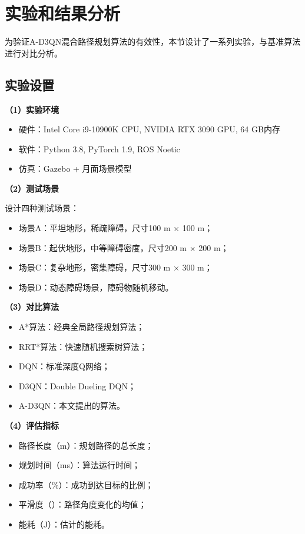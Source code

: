 \section{实验和结果分析}
\label{sec:ch6_experiments}

为验证A-D3QN混合路径规划算法的有效性，本节设计了一系列实验，与基准算法进行对比分析。

\subsection{实验设置}
\label{subsec:ch6_setup}

\textbf{（1）实验环境}

\begin{itemize}
    \item 硬件：Intel Core i9-10900K CPU, NVIDIA RTX 3090 GPU, 64 GB内存
    \item 软件：Python 3.8, PyTorch 1.9, ROS Noetic
    \item 仿真：Gazebo + 月面场景模型
\end{itemize}

\textbf{（2）测试场景}

设计四种测试场景：
\begin{itemize}
    \item 场景A：平坦地形，稀疏障碍，尺寸100 m × 100 m；
    \item 场景B：起伏地形，中等障碍密度，尺寸200 m × 200 m；
    \item 场景C：复杂地形，密集障碍，尺寸300 m × 300 m；
    \item 场景D：动态障碍场景，障碍物随机移动。
\end{itemize}

\textbf{（3）对比算法}

\begin{itemize}
    \item A*算法：经典全局路径规划算法；
    \item RRT*算法：快速随机搜索树算法；
    \item DQN：标准深度Q网络；
    \item D3QN：Double Dueling DQN；
    \item A-D3QN：本文提出的算法。
\end{itemize}

\textbf{（4）评估指标}

\begin{itemize}
    \item 路径长度（m）：规划路径的总长度；
    \item 规划时间（ms）：算法运行时间；
    \item 成功率（\%）：成功到达目标的比例；
    \item 平滑度（\degree）：路径角度变化的均值；
    \item 能耗（J）：估计的能耗。
\end{itemize}

